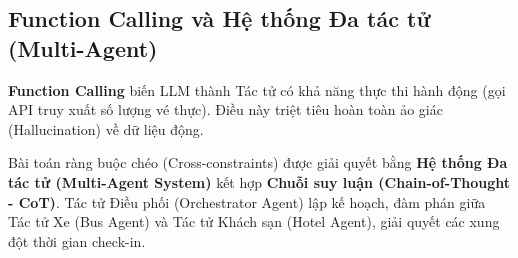 \subsection{Function Calling và Hệ thống Đa tác tử (Multi-Agent)}
\textbf{Function Calling} biến LLM thành Tác tử có khả năng thực thi hành động (gọi API truy xuất số lượng vé thực). Điều này triệt tiêu hoàn toàn ảo giác (Hallucination) về dữ liệu động.

Bài toán ràng buộc chéo (Cross-constraints) được giải quyết bằng \textbf{Hệ thống Đa tác tử (Multi-Agent System)} kết hợp \textbf{Chuỗi suy luận (Chain-of-Thought - CoT)}. Tác tử Điều phối (Orchestrator Agent) lập kế hoạch, đàm phán giữa Tác tử Xe (Bus Agent) và Tác tử Khách sạn (Hotel Agent), giải quyết các xung đột thời gian check-in.
